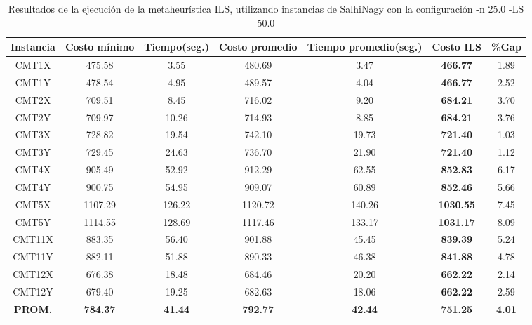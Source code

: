 \begin{table}[ht]
\caption{Resultados de la ejecución de la metaheurística ILS, utilizando instancias de SalhiNagy con la configuración -n 25.0 -LS 50.0}
\centering
\small
\begin{tabular}{c c c c c c c}
\hline\hline
Instancia & Costo mínimo & Tiempo(seg.) & Costo promedio & Tiempo promedio(seg.) & Costo ILS & \%Gap \\ [0.5ex]
\hline
CMT1X & 475.58 & 3.55 & 
480.69 & 3.47 & \bf{466.77} & 
1.89\\CMT1Y & 478.54 & 4.95 & 
489.57 & 4.04 & \bf{466.77} & 
2.52\\CMT2X & 709.51 & 8.45 & 
716.02 & 9.20 & \bf{684.21} & 
3.70\\CMT2Y & 709.97 & 10.26 & 
714.93 & 8.85 & \bf{684.21} & 
3.76\\CMT3X & 728.82 & 19.54 & 
742.10 & 19.73 & \bf{721.40} & 
1.03\\CMT3Y & 729.45 & 24.63 & 
736.70 & 21.90 & \bf{721.40} & 
1.12\\CMT4X & 905.49 & 52.92 & 
912.29 & 62.55 & \bf{852.83} & 
6.17\\CMT4Y & 900.75 & 54.95 & 
909.07 & 60.89 & \bf{852.46} & 
5.66\\CMT5X & 1107.29 & 126.22 & 
1120.72 & 140.26 & \bf{1030.55} & 
7.45\\CMT5Y & 1114.55 & 128.69 & 
1117.46 & 133.17 & \bf{1031.17} & 
8.09\\CMT11X & 883.35 & 56.40 & 
901.88 & 45.45 & \bf{839.39} & 
5.24\\CMT11Y & 882.11 & 51.88 & 
890.33 & 46.38 & \bf{841.88} & 
4.78\\CMT12X & 676.38 & 18.48 & 
684.46 & 20.20 & \bf{662.22} & 
2.14\\CMT12Y & 679.40 & 19.25 & 
682.63 & 18.06 & \bf{662.22} & 
2.59\\\bf{PROM.} & 
\bf{784.37} & \bf{41.44} & \bf{792.77} & \bf{42.44} & \bf{751.25} & \bf{4.01}\\[1ex]\hline
\end{tabular}
\label{table:nonlin}
\end{table} \clearpage
